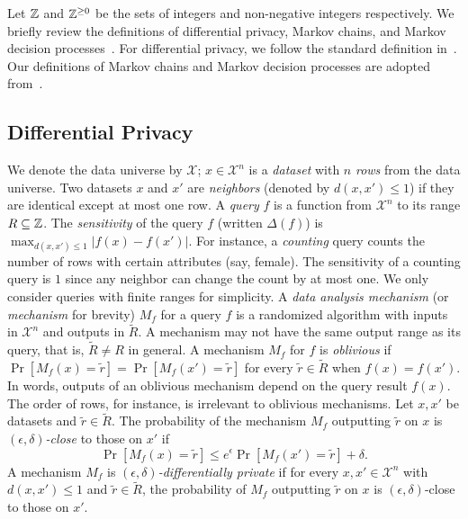 
Let $\mathbb{Z}$ and $\mathbb{Z}^{\geq 0}$ be the sets of integers and non-negative integers respectively.
We briefly review the definitions of differential privacy, Markov
chains, and Markov decision processes~\cite{Put05}. For differential privacy, we
follow the standard definition in~\cite{DR:14:AFDP,GRS:09:UUPM,GRS:12:UUPM}. Our
definitions of Markov chains and Markov decision processes are adopted
from~\cite{BK:08:PMC}.

\subsection{Differential Privacy}
We denote the data universe by $\mathcal{X}$; $x \in \mathcal{X}^n$ is
a \emph{dataset} with $n$ \emph{rows} from the data universe. Two datasets $x$ and
$x'$ are \emph{neighbors} (denoted by $d(x, x') \leq 1$) if they are
identical except at most one row. A \emph{query} $f$ is a function
from $\mathcal{X}^n$ to its range $R \subseteq \mathbb{Z}$. The \emph{sensitivity} of the
query $f$ (written $\Delta (f)$) is $\max_{d(x, x') \leq 1} | f (x) -
f (x') |$. For instance, a \emph{counting} query counts the number
of rows with certain attributes (say, female). The sensitivity of a
counting query is $1$ since any neighbor can change the count by at
most one. We only consider queries with finite  ranges for simplicity.
A \emph{data analysis mechanism} (or
\emph{mechanism} for brevity) $M_f$ for a query $f$
is a randomized algorithm with inputs in $\mathcal{X}^n$ and outputs
in $\tilde{R}$.
A mechanism may not have the same output range as its query, that is,
$\tilde{R} \neq R$ in general.
A mechanism $M_f$ for $f$ is \emph{oblivious} if
$\Pr[M_f(x) = \tilde{r}] = \Pr[M_f(x') = \tilde{r}]$ for every
$\tilde{r} \in \tilde{R}$ when $f (x) = f (x')$. In words, outputs of an
oblivious mechanism depend on the query result $f (x)$.
The order of rows, for instance, is
irrelevant to oblivious mechanisms. Let $x, x'$
be datasets and $\tilde{r} \in \tilde{R}$. The probability of
the mechanism $M_f$ outputting $\tilde{r}$ on $x$ is
\emph{$(\epsilon, \delta)$-close} to those on $x'$ if
\[
\Pr[M_f (x) = \tilde{r}] \leq e^{\epsilon} \Pr[M_f (x') =
\tilde{r}] + \delta.
\]
A mechanism $M_f$ is \emph{$(\epsilon, \delta)$-differentially
  private} %
if for every $x, x' \in \mathcal{X}^n$ with $d(x, x') \leq 1$
and $\tilde{r} \in \tilde{R}$, the probability of
$M_f$ outputting $\tilde{r}$ on $x$ is $(\epsilon, \delta)$-close to
those on $x'$.


